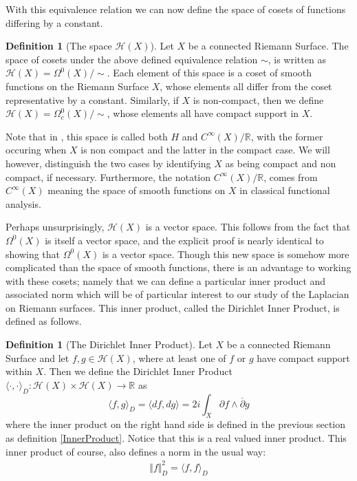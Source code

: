 \documentclass[11pt]{report}
\theoremstyle{definition}
\newtheorem{defn}[thm]{Definition}
\begin{document}
With this equivalence relation we can now define the space of cosets of functions differing by a constant.

\begin{defn}[The space $\mathcal{H}(X)$]
  Let $X$ be a connected Riemann Surface. The space of cosets under the above defined equivalence relation $\sim$, is written as $\mathcal{H}(X) = \Omega^0(X)/\sim$. Each element of this space is a coset of smooth functions on the Riemann Surface $X$, whose elements all differ from the coset representative by a constant. 
  Similarly, if $X$ is non-compact, then we define $\mathcal{H}(X) = \Omega^0_c(X)/\sim$, whose elements all have compact support in $X$.
\end{defn}

Note that in \cite{donaldson}, this space is called both $H$ and $C^{\infty}(X)/\mathbb{R}$, with the former occuring when $X$ is non compact and the latter in the compact case. We will however, distinguish the two cases by identifying $X$ as being compact and non compact, if necessary. Furthermore, the notation $C^{\infty}(X)/\mathbb{R}$, comes from $C^{\infty}(X)$ meaning the space of smooth functions on $X$ in classical functional analysis. 

Perhaps unsurprisingly, $\mathcal{H}(X)$ is a vector space. This follows from the fact that $\Omega^0(X)$ is itself a vector space, and the explicit proof is nearly identical to showing that $\Omega^0(X)$ is a vector space. Though this new space is somehow more complicated than the space of smooth functions, there is an advantage to working with these cosets; namely that we can define a particular inner product and associated norm which will be of particular interest to our study of the Laplacian on Riemann surfaces. This inner product, called the Dirichlet Inner Product, is defined as follows.

\begin{defn}[The Dirichlet Inner Product]\label{dInnerProduct}
  Let $X$ be a connected Riemann Surface and let $f, g \in \mathcal{H}(X)$, where at least one of $f$ or $g$ have compact support within $X$. Then we define the Dirichlet Inner Product $\langle \cdot, \cdot \rangle_D : \mathcal{H}(X) \times \mathcal{H}(X) \rightarrow \mathbb{R}$ as 
  \[
    \langle f, g \rangle_D =\langle df, dg \rangle = 2i \int_X \partial f \wedge \overline{\partial} g 
  \]
  where the inner product on the right hand side is defined in the previous section as definition \ref{InnerProduct}. Notice that this is a real valued inner product.
  This inner product of course, also defines a norm in the usual way:
  \begin{align*}
    \Vert f\Vert _D^2 = \langle f, f \rangle_D
  \end{align*}
\end{defn}
\end{document}

